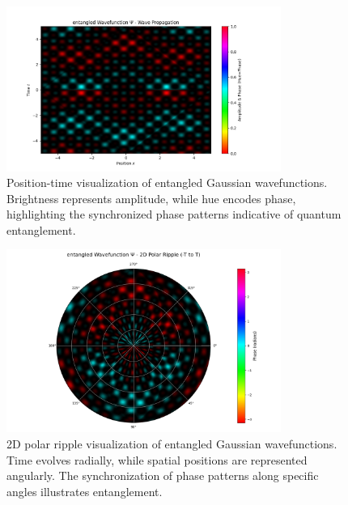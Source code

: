 \documentclass[12pt]{article}
\begin{document}
\begin{figure}[H]
\centering
\includegraphics[width=0.8\textwidth]{images/entangled_wavefunction_probability_density_with_phase.png}
\caption{Position-time visualization of entangled Gaussian wavefunctions. Brightness represents amplitude, while hue encodes phase, highlighting the synchronized phase patterns indicative of quantum entanglement.}
\label{fig:entangled}
\end{figure}

\begin{figure}[H]
\centering
\includegraphics[width=0.8\textwidth]{images/entangled_wavefunction_2d_polar_probability_density_with_phase.png}
\caption{2D polar ripple visualization of entangled Gaussian wavefunctions. Time evolves radially, while spatial positions are represented angularly. The synchronization of phase patterns along specific angles illustrates entanglement.}
\label{fig:entangled_2d_polar}
\end{figure}
\end{document}
